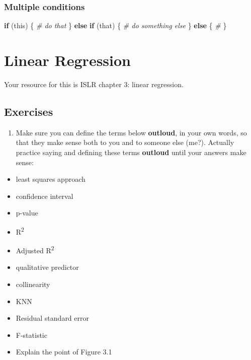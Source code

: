 \documentclass[
]{book}
\newenvironment{Shaded}{\begin{snugshade}}{\end{snugshade}}
\newcommand{\CommentTok}[1]{\textcolor[rgb]{0.56,0.35,0.01}{\textit{#1}}}
\newcommand{\ControlFlowTok}[1]{\textcolor[rgb]{0.13,0.29,0.53}{\textbf{#1}}}
\newcommand{\NormalTok}[1]{#1}
\providecommand{\tightlist}{%
  \setlength{\itemsep}{0pt}\setlength{\parskip}{0pt}}
\begin{document}
\hypertarget{multiple-conditions}{%
\subsection{Multiple conditions}\label{multiple-conditions}}

\begin{Shaded}
\begin{Highlighting}[]
\ControlFlowTok{if}\NormalTok{ (this) \{}
  \CommentTok{\# do that}
\NormalTok{\} }\ControlFlowTok{else} \ControlFlowTok{if}\NormalTok{ (that) \{}
  \CommentTok{\# do something else}
\NormalTok{\} }\ControlFlowTok{else}\NormalTok{ \{}
  \CommentTok{\# }
\NormalTok{\}}
\end{Highlighting}
\end{Shaded}

\hypertarget{linear-regression}{%
\chapter{Linear Regression}\label{linear-regression}}

Your resource for this is ISLR chapter 3: linear regression.

\hypertarget{exercises}{%
\section{Exercises}\label{exercises}}

\begin{enumerate}
\def\labelenumi{\arabic{enumi}.}
\tightlist
\item
  Make sure you can define the terms below \textbf{outloud}, in your own words, so that they make sense both to you and to someone else (me?). Actually practice saying and defining these terms \textbf{outloud} until your answers make sense:
\end{enumerate}

\begin{itemize}
\tightlist
\item
  least squares approach
\item
  confidence interval
\item
  p-value
\item
  R\textsuperscript{2}
\item
  Adjusted R\textsuperscript{2}
\item
  qualitative predictor
\item
  collinearity
\item
  KNN
\item
  Residual standard error
\item
  F-statistic
\item
  Explain the point of Figure 3.1
\end{itemize}
\end{document}
